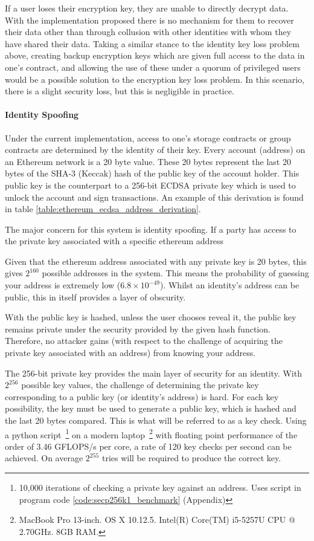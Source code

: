 If a user loses their encryption key, they are unable to directly decrypt data. With the implementation proposed there is no mechanism for them to recover their data other than through collusion with other identities with whom they have shared their data. Taking a similar stance to the identity key loss problem above, creating backup encryption keys which are given full access to the data in one's contract, and allowing the use of these under a quorum of privileged users would be a possible solution to the encryption key loss problem. In this scenario, there is a slight security loss, but this is negligible in practice.

\paragraph{Identity Spoofing}

Under the current implementation, access to one's storage contracts or group contracts are determined by the identity of their key. Every account (address) on an Ethereum network is a 20 byte value. These 20 bytes represent the last 20 bytes of the SHA-3 (Keccak) hash of the public key of the account holder. This public key is the counterpart to a 256-bit ECDSA private key which is used to unlock the account and sign transactions. An example of this derivation is found in table \ref{table:ethereum_ecdsa_address_derivation}.



The major concern for this system is identity spoofing. If a party has access to the private key associated with a specific ethereum address

Given that the ethereum address associated with any private key is 20 bytes, this gives $2^{160}$ possible addresses in the system. This means the probability of
guessing your address is extremely low ($6.8 \times 10^{-49}$). Whilst an identity's address can be public, this in itself provides a layer of obscurity.

With the public key is hashed, unless the user chooses reveal it, the public key remains private under the security provided by the given hash function. Therefore, no attacker gains (with respect to the challenge of acquiring the private key associated with an address) from knowing your address.

The 256-bit private key provides the main layer of security for an identity. With $2^{256}$ possible key values, the challenge of determining the private key corresponding to a public key (or identity's address) is hard. For each key possibility, the key must be used to generate a public key, which is hashed and the last 20 bytes compared. This is what will be referred to as a key check. Using a python script~\footnote{10,000 iterations of checking a private key against an address. Uses script in program code \ref{code:secp256k1_benchmark} (Appendix)} on a modern laptop~\footnote{MacBook Pro 13-inch. OS X 10.12.5. Intel(R) Core(TM) i5-5257U CPU @ 2.70GHz. 8GB RAM.} with floating point performance of the order of 3.46 GFLOPS/s per core, a rate of 120 key checks per second can be achieved. On average $2^{255}$ tries will be required to produce the correct key.


